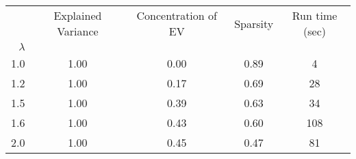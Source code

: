 \begin{tabular}{r|cccc}
\toprule
{} &  Explained Variance &  Concentration of EV &  Sparsity & Run time (sec) \\
$\lambda$ &                     &                      &           &                \\
\midrule
1.0       &                1.00 &                 0.00 &      0.89 &              4 \\
1.2       &                1.00 &                 0.17 &      0.69 &             28 \\
1.5       &                1.00 &                 0.39 &      0.63 &             34 \\
1.6       &                1.00 &                 0.43 &      0.60 &            108 \\
2.0       &                1.00 &                 0.45 &      0.47 &             81 \\
\bottomrule
\end{tabular}
